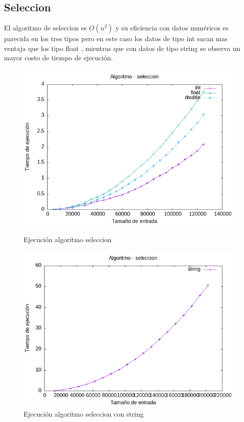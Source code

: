 \documentclass[11pt]{article}
\begin{document}
\subsection*{Seleccion}
El algoritmo de seleccion es \(O(n^2)\) y su eficiencia con datos numéricos es parecida en los tres
tipos pero en este caso los datos de tipo int sacan mas ventaja que los tipo float , mientras que con datos de tipo string se observa un mayor costo de tiempo de ejecución.
\begin{figure}[H]
    \begin{minipage}{0.5\textwidth}
        \centering
        \includegraphics[width=\linewidth]{assets/Img/seleccion.png}
        \caption{Ejecución algoritmo seleccion}
        \label{fig:seleccion}
    \end{minipage}%
    \begin{minipage}{0.5\textwidth}
        \centering
        \includegraphics[width=\linewidth]{assets/Img/seleccionstring.png}
        \caption{Ejecución algoritmo seleccion con string}
        \label{fig:seleccionstring}
    \end{minipage}
\end{figure}
\end{document}
